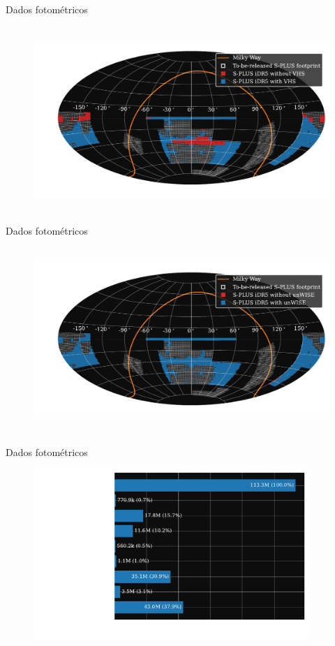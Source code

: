 \begin{frame}[c]{Dados fotométricos}
    \begin{figure}
        \centering
        \includegraphics[height=7cm]{script/images/splus_footprint_idr5_VHS.pdf}
    \end{figure}
\end{frame}

\begin{frame}[c]{Dados fotométricos}
    \begin{figure}
        \centering
        \includegraphics[height=7cm]{script/images/splus_footprint_idr5_unWISE.pdf}
    \end{figure}
\end{frame}

\begin{frame}[c]{Dados fotométricos}
    \begin{figure}
        \centering
        \includegraphics[height=6.5cm]{script/images/crossmatch_stats.pdf}
    \end{figure}
\end{frame}

